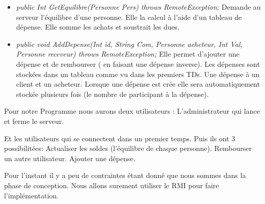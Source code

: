 \documentclass[12,french]{report}
\begin{document}
\begin{itemize}[label=\textbullet]
	\item \textit{public Int GetEquilibre(Personne Pers) throws RemoteException;}
Demande au serveur l’équilibre d’une personne. Elle la calcul à l’aide d’un tableau de dépense. Elle somme les achats et soustrait les dues.
	\item \textit{public void AddDepense(Int id, String Com, Personne acheteur, Int Val, Personne receveur) throws RemoteException;}
Elle permet d’ajouter une dépense et de rembourser ( en faisant une dépense inverse). Les dépenses sont stockées dans un tableau comme vu dans les premiers TDs. Une dépense à un client et un acheteur. Lorsque une dépense est crée elle sera automatiquement stockée plusieurs fois (le nombre de participant à la dépense).
\end{itemize}\vspace{0.5cm}

Pour notre Programme nous aurons deux utilisateurs :
L’administrateur qui lance et ferme le serveur.

Et les utilisateurs qui se connectent dans un premier temps. Puis ils ont 3 possibilitées:
Actualiser les soldes (l’équilibre de chaque personne).
Rembourser un autre utilisateur.
Ajouter une dépense.

Pour l’instant il y a peu de contraintes étant donné que nous sommes dans la phase de conception. Nous allons surement utiliser le RMI pour faire l'implémentation. 
\end{document}
